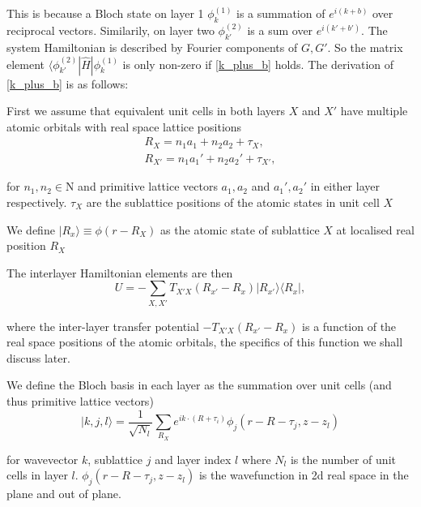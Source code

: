 \documentclass[12pt]{report} %
\begin{document}
  This is because a Bloch state on layer 1 $\phi_k^{(1)}$ is a summation of $e^{i(k+b)}$ over reciprocal vectors. Similarily, on layer two $\phi_{k'}^{(2)}$ is a sum over $e^{i(k'+b')}$. The system Hamiltonian is described by Fourier components of $G, G'$. So the matrix element $\langle \phi_{k'}^{(2)} | \hat{H} | \phi_{k}^{(1)}$ is only non-zero if \ref{k_plus_b} holds. The derivation of \ref{k_plus_b} is as follows:

  First we assume that equivalent unit cells in both layers $X$ and $X'$ have multiple atomic orbitals with real space lattice positions
  \begin{equation}
    \begin{gathered}
    R_X = n_1 a_1 + n_2 a_2 + \tau_X,\\
    R_{X'} = n_1 a_1' + n_2 a_2' + \tau_{X'},
    \end{gathered}
    \label{inter-layer_real_sublattice_positions}
  \end{equation}

  for $n_1, n_2 \in \mathrm{N}$ and primitive lattice vectors $a_1, a_2$ and $a_1', a_2'$ in either layer respectively. $\tau_X$ are the sublattice positions of the atomic states in unit cell $X$

  We define $| R_x \rangle \equiv \phi(r - R_X)$ as the atomic state of sublattice $X$ at localised real position $R_X$

  The interlayer Hamiltonian elements are then
  \begin{equation}
    U = -\sum_{X, X'} T_{X'X}(R_{x'} - R_x) |R_{x'}\rangle \langle R_x|,
    \label{inter-layer_hamiltonian_elements}
  \end{equation}

  where the inter-layer transfer potential $-T_{X'X}(R_{x'} - R_x)$ is a function of the real space positions of the atomic orbitals, the specifics of this function we shall discuss later.

  We define the Bloch basis in each layer as the summation over unit cells (and thus primitive lattice vectors)
  \begin{equation}
    | k,j,l \rangle = \frac{1}{\sqrt{N_l}}\sum_{R_X}e^{ik\cdot(R+\tau_i)}\phi_j(r-R-\tau_j, z-z_l)
    \label{inter-layer_real_bloch_basis}
  \end{equation}

  for wavevector $k$, sublattice $j$ and layer index $l$ where $N_l$ is the number of unit cells in layer $l$. $\phi_j (r - R - \tau_j, z-z_l)$ is the wavefunction in 2d real space in the plane and out of plane.
\end{document}
